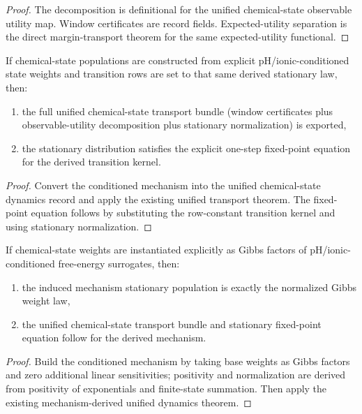 \begin{proof}
The decomposition is definitional for the unified chemical-state observable utility map. Window certificates are record fields. Expected-utility separation is the direct margin-transport theorem for the same expected-utility functional.
\end{proof}

\begin{theorem}\label{thm:chemical-conditioned-mechanism-dynamics}
If chemical-state populations are constructed from explicit pH/ionic-conditioned state weights and transition rows are set to that same derived stationary law, then:
\begin{enumerate}
\item the full unified chemical-state transport bundle (window certificates plus observable-utility decomposition plus stationary normalization) is exported,
\item the stationary distribution satisfies the explicit one-step fixed-point equation for the derived transition kernel.
\end{enumerate}
\end{theorem}

\begin{proof}
Convert the conditioned mechanism into the unified chemical-state dynamics record and apply the existing unified transport theorem. The fixed-point equation follows by substituting the row-constant transition kernel and using stationary normalization.
\end{proof}

\begin{theorem}\label{thm:gibbs-conditioned-mechanism-dynamics}
If chemical-state weights are instantiated explicitly as Gibbs factors of pH/ionic-conditioned free-energy surrogates, then:
\begin{enumerate}
\item the induced mechanism stationary population is exactly the normalized Gibbs weight law,
\item the unified chemical-state transport bundle and stationary fixed-point equation follow for the derived mechanism.
\end{enumerate}
\end{theorem}

\begin{proof}
Build the conditioned mechanism by taking base weights as Gibbs factors and zero additional linear sensitivities; positivity and normalization are derived from positivity of exponentials and finite-state summation. Then apply the existing mechanism-derived unified dynamics theorem.
\end{proof}

